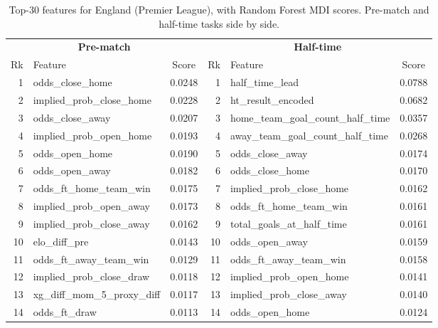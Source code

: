 \documentclass[pdflatex,sn-mathphys-num]{sn-jnl}
\theoremstyle{thmstyleone}
\theoremstyle{thmstyletwo}
\theoremstyle{thmstylethree}
\begin{document}
\begin{table}[h]
\caption{Top-30 features for England (Premier League), with Random
Forest MDI scores. Pre-match and half-time tasks side by side.}\label{tab:fi-eng}
\footnotesize
\begin{tabular*}{\textwidth}{@{\extracolsep\fill}rlc|rlc@{}}
\toprule
\multicolumn{3}{c|}{\textbf{Pre-match}} & \multicolumn{3}{c}{\textbf{Half-time}} \\
Rk & Feature & Score & Rk & Feature & Score \\
\midrule
1  & odds\_close\_home                  & 0.0248 & 1  & half\_time\_lead                       & 0.0788 \\
2  & implied\_prob\_close\_home          & 0.0228 & 2  & ht\_result\_encoded                    & 0.0682 \\
3  & odds\_close\_away                  & 0.0207 & 3  & home\_team\_goal\_count\_half\_time     & 0.0357 \\
4  & implied\_prob\_open\_home           & 0.0193 & 4  & away\_team\_goal\_count\_half\_time     & 0.0268 \\
5  & odds\_open\_home                   & 0.0190 & 5  & odds\_close\_away                       & 0.0174 \\
6  & odds\_open\_away                   & 0.0182 & 6  & odds\_close\_home                       & 0.0170 \\
7  & odds\_ft\_home\_team\_win          & 0.0175 & 7  & implied\_prob\_close\_home              & 0.0162 \\
8  & implied\_prob\_open\_away           & 0.0173 & 8  & odds\_ft\_home\_team\_win               & 0.0161 \\
9  & implied\_prob\_close\_away          & 0.0162 & 9  & total\_goals\_at\_half\_time            & 0.0161 \\
10 & elo\_diff\_pre                     & 0.0143 & 10 & odds\_open\_away                        & 0.0159 \\
11 & odds\_ft\_away\_team\_win          & 0.0129 & 11 & odds\_ft\_away\_team\_win               & 0.0158 \\
12 & implied\_prob\_close\_draw          & 0.0118 & 12 & implied\_prob\_open\_home               & 0.0141 \\
13 & xg\_diff\_mom\_5\_proxy\_diff       & 0.0117 & 13 & implied\_prob\_close\_away              & 0.0140 \\
14 & odds\_ft\_draw                     & 0.0113 & 14 & odds\_open\_home                        & 0.0124 \\

\end{tabular*}
\end{table}
\end{document}
